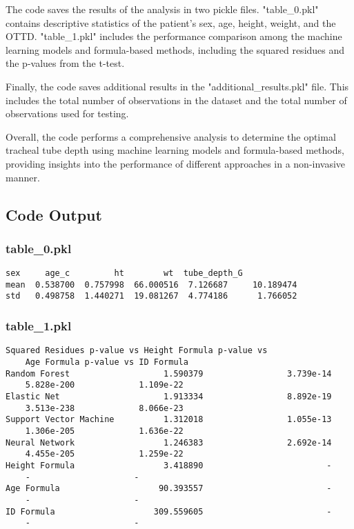 \documentclass[11pt]{article}
\begin{document}
The code saves the results of the analysis in two pickle files. "table\_0.pkl" contains descriptive statistics of the patient's sex, age, height, weight, and the OTTD. "table\_1.pkl" includes the performance comparison among the machine learning models and formula-based methods, including the squared residues and the p-values from the t-test.

Finally, the code saves additional results in the "additional\_results.pkl" file. This includes the total number of observations in the dataset and the total number of observations used for testing.

Overall, the code performs a comprehensive analysis to determine the optimal tracheal tube depth using machine learning models and formula-based methods, providing insights into the performance of different approaches in a non-invasive manner.

\subsection{Code Output}

\subsubsection*{table\_0.pkl}

\begin{Verbatim}[tabsize=4]
           sex     age_c         ht        wt  tube_depth_G
mean  0.538700  0.757998  66.000516  7.126687     10.189474
std   0.498758  1.440271  19.081267  4.774186      1.766052
\end{Verbatim}

\subsubsection*{table\_1.pkl}

\begin{Verbatim}[tabsize=4]
                        Squared Residues p-value vs Height Formula p-value vs
	Age Formula p-value vs ID Formula
Random Forest                   1.590379                 3.739e-14
	5.828e-200             1.109e-22
Elastic Net                     1.913334                 8.892e-19
	3.513e-238             8.066e-23
Support Vector Machine          1.312018                 1.055e-13
	1.306e-205             1.636e-22
Neural Network                  1.246383                 2.692e-14
	4.455e-205             1.259e-22
Height Formula                  3.418890                         -
	-                     -
Age Formula                    90.393557                         -
	-                     -
ID Formula                    309.559605                         -
	-                     -
\end{Verbatim}
\end{document}
